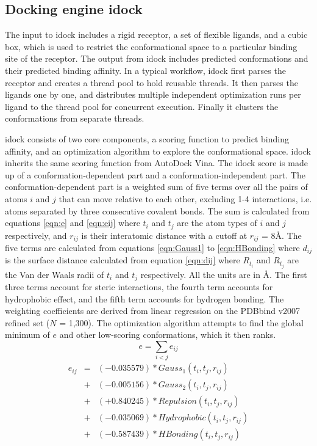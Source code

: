 \documentclass[10pt]{article}
\begin{document}
\subsection*{Docking engine idock}
The input to idock includes a rigid receptor, a set of flexible ligands, and a cubic box, which is used to restrict the conformational space to a particular binding site of the receptor. The output from idock includes predicted conformations and their predicted binding affinity. In a typical workflow, idock first parses the receptor and creates a thread pool to hold reusable threads. It then parses the ligands one by one, and distributes multiple independent optimization runs per ligand to the thread pool for concurrent execution. Finally it clusters the conformations from separate threads.

idock consists of two core components, a scoring function to predict binding affinity, and an optimization algorithm to explore the conformational space. idock inherits the same scoring function from AutoDock Vina. The idock score is made up of a conformation-dependent part and a conformation-independent part. The conformation-dependent part is a weighted sum of five terms over all the pairs of atoms $i$ and $j$ that can move relative to each other, excluding 1-4 interactions, i.e. atoms separated by three consecutive covalent bonds. The sum is calculated from equations \eqref{eqn:e} and \eqref{eqn:eij} where $t_i$ and $t_j$ are the atom types of $i$ and $j$ respectively, and $r_{ij}$ is their interatomic distance with a cutoff at $r_{ij}$ = 8\AA. The five terms are calculated from equations \eqref{eqn:Gauss1} to \eqref{eqn:HBonding} where $d_{ij}$ is the surface distance calculated from equation \eqref{eqn:dij} where $R_{t_i}$ and $R_{t_j}$ are the Van der Waals radii of $t_i$ and $t_j$ respectively. All the units are in \AA. The first three terms account for steric interactions, the fourth term accounts for hydrophobic effect, and the fifth term accounts for hydrogen bonding. The weighting coefficients are derived from linear regression on the PDBbind \cite{529,530} v2007 refined set ($N$ = 1,300). The optimization algorithm attempts to find the global minimum of $e$ and other low-scoring conformations, which it then ranks.
\begin{equation}
\label{eqn:e}
e = \sum_{i < j} e_{ij}
\end{equation}
\begin{eqnarray}
\label{eqn:eij}
e_{ij} &=& (-0.035579) * Gauss_1(t_i, t_j, r_{ij}) \nonumber \\
       &+& (-0.005156) * Gauss_2(t_i, t_j, r_{ij}) \nonumber \\
       &+& (+0.840245) * Repulsion(t_i, t_j, r_{ij}) \nonumber \\
       &+& (-0.035069) * Hydrophobic(t_i, t_j, r_{ij}) \nonumber \\
       &+& (-0.587439) * HBonding(t_i, t_j, r_{ij})
\end{eqnarray}
\end{document}
